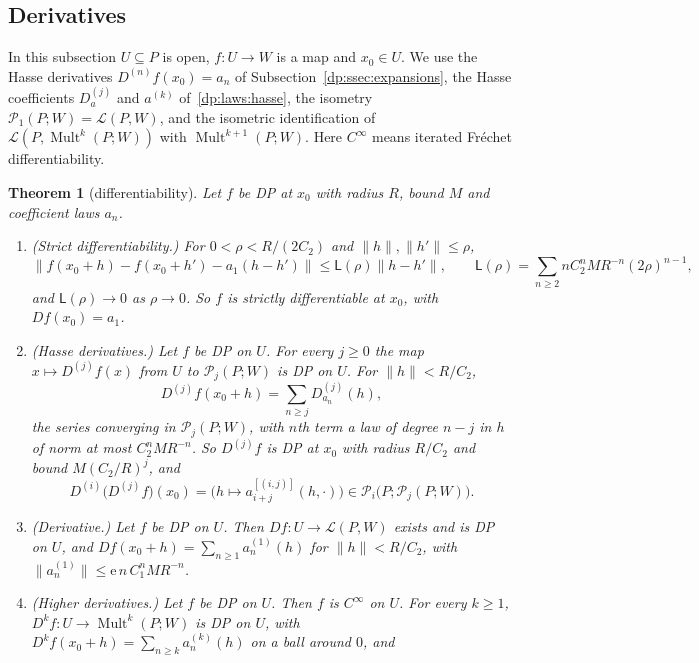 \documentclass[11pt]{amsart}
\newtheorem{theorem}{Theorem}[section]
\theoremstyle{definition}
\theoremstyle{remark}
\numberwithin{equation}{section}
\newcommand{\cL}{\mathcal L}
\newcommand{\Mult}{\operatorname{Mult}}
\newcommand{\norm}[1]{\lVert #1\rVert}
\theoremstyle{plain}
\theoremstyle{definition}
\theoremstyle{plain}
\newcommand{\cP}{\mathcal P}
\begin{document}
\subsection{Derivatives}\label{dp:ssec:derivatives}

In this subsection $U\subseteq P$ is open, $f\colon U\to W$ is a map and $x_0\in U$. We use the Hasse derivatives $D^{(n)}f(x_0)=a_n$ of Subsection~\ref{dp:ssec:expansions}, the Hasse coefficients $D^{(j)}_a$ and $a^{(k)}$ of~\eqref{dp:laws:hasse}, the isometry $\cP_1(P;W)=\cL(P,W)$, and the isometric identification of $\cL(P,\Mult^k(P;W))$ with $\Mult^{k+1}(P;W)$. Here $C^\infty$ means iterated Fr\'echet differentiability.

\begin{theorem}[differentiability]\label{dp:thm:differentiable}
Let $f$ be DP at $x_0$ with radius $R$, bound $M$ and coefficient laws $a_n$.
\begin{enumerate}
\item \textup{(Strict differentiability.)} For $0<\rho<R/(2C_2)$ and $\norm h,\norm{h'}\le\rho$,
\begin{equation}\label{dp:4b:eq:strict}
 \norm{f(x_0+h)-f(x_0+h')-a_1(h-h')}\le\mathsf L(\rho)\norm{h-h'},\qquad
 \mathsf L(\rho)=\sum_{n\ge2}nC_2^nMR^{-n}(2\rho)^{n-1},
\end{equation}
and $\mathsf L(\rho)\to0$ as $\rho\to0$. So $f$ is strictly differentiable at $x_0$, with $Df(x_0)=a_1$.
\item \textup{(Hasse derivatives.)} Let $f$ be DP on $U$. For every $j\ge0$ the map $x\mapsto D^{(j)}f(x)$ from $U$ to $\cP_j(P;W)$ is DP on $U$. For $\norm h<R/C_2$,
\begin{equation}\label{dp:4b:eq:hasse-expansion}
 D^{(j)}f(x_0+h)=\sum_{n\ge j}D^{(j)}_{a_n}(h),
\end{equation}
the series converging in $\cP_j(P;W)$, with $n$th term a law of degree $n-j$ in $h$ of norm at most $C_2^nMR^{-n}$. So $D^{(j)}f$ is DP at $x_0$ with radius $R/C_2$ and bound $M(C_2/R)^j$, and
\begin{equation}\label{dp:4b:eq:hasse-iterated-law}
 D^{(i)}\bigl(D^{(j)}f\bigr)(x_0)=\bigl(h\mapsto a_{i+j}^{[(i,j)]}(h,\cdot)\bigr)\in\cP_i\bigl(P;\cP_j(P;W)\bigr).
\end{equation}
\item \textup{(Derivative.)} Let $f$ be DP on $U$. Then $Df\colon U\to\cL(P,W)$ exists and is DP on $U$, and $Df(x_0+h)=\sum_{n\ge1}a_n^{(1)}(h)$ for $\norm h<R/C_2$, with $\norm{a_n^{(1)}}\le\mathrm e\,n\,C_1^nMR^{-n}$.
\item \textup{(Higher derivatives.)} Let $f$ be DP on $U$. Then $f$ is $C^\infty$ on $U$. For every $k\ge1$, $D^kf\colon U\to\Mult^k(P;W)$ is DP on $U$, with $D^kf(x_0+h)=\sum_{n\ge k}a_n^{(k)}(h)$ on a ball around $0$, and

\end{enumerate}
\end{theorem}
\end{document}
